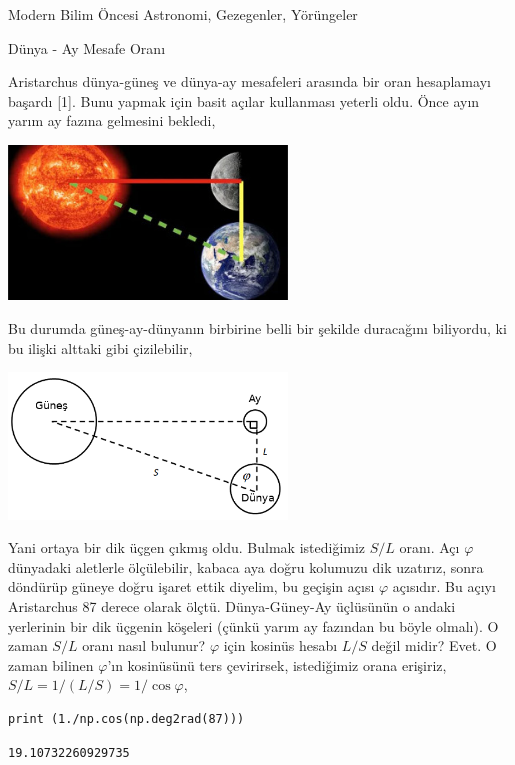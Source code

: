 \documentclass[12pt,fleqn]{article}\usepackage{../../common}
\begin{document}
Modern Bilim Öncesi Astronomi, Gezegenler, Yörüngeler

Dünya - Ay Mesafe Oranı

Aristarchus dünya-güneş ve dünya-ay mesafeleri arasında bir oran hesaplamayı
başardı [1]. Bunu yapmak için basit açılar kullanması yeterli oldu. Önce ayın
yarım ay fazına gelmesini bekledi,

\includegraphics[width=20em]{moonshad.jpg}

Bu durumda güneş-ay-dünyanın birbirine belli bir şekilde duracağını biliyordu, ki
bu ilişki alttaki gibi çizilebilir,

\includegraphics[width=20em]{sunmoon.png}

Yani ortaya bir dik üçgen çıkmış oldu. Bulmak istediğimiz $S/L$ oranı. Açı
$\varphi$ dünyadaki aletlerle ölçülebilir, kabaca aya doğru kolumuzu dik
uzatırız, sonra döndürüp güneye doğru işaret ettik diyelim, bu geçişin açısı
$\varphi$ açısıdır. Bu açıyı Aristarchus 87 derece olarak ölçtü. Dünya-Güney-Ay
üçlüsünün o andaki yerlerinin bir dik üçgenin köşeleri (çünkü yarım ay fazından
bu böyle olmalı). O zaman $S/L$ oranı nasıl bulunur?  $\varphi$ için kosinüs
hesabı $L/S$ değil midir?  Evet. O zaman bilinen $\varphi$'ın kosinüsünü ters
çevirirsek, istediğimiz orana erişiriz, $S/L = 1/(L/S) = 1 / \cos\varphi$,

\begin{verbatim}
print (1./np.cos(np.deg2rad(87)))
\end{verbatim}

\begin{verbatim}
19.10732260929735
\end{verbatim}
\end{document}
